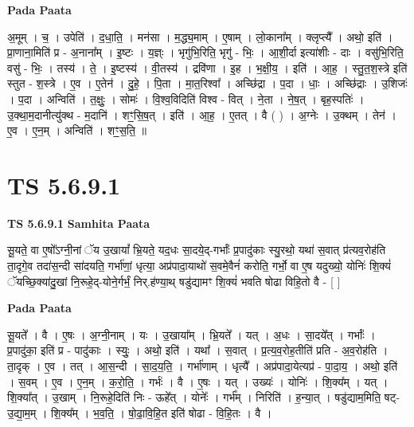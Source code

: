 \documentclass[17pt]{extarticle}
\begin{document}
\textbf{Pada Paata} \newline

अ॒मूम् । च॒ । उपेति॑ । द॒धा॒ति॒ । मन॑सा । म॒द्ध्य॒माम् । ए॒षाम् । लो॒काना᳚म् । क्लृप्त्यै᳚ । अथो॒ इति॑ । प्रा॒णाना॒मिति॑ प्र - अ॒नाना᳚म् । इ॒ष्टः । य॒ज्ञ्ः । भृगु॑भि॒रिति॒ भृगु॑ - भिः॒ । आ॒शी॒र्दा इत्या॑शीः - दाः । वसु॑भि॒रिति॒ वसु॑ - भिः॒ । तस्य॑ । ते॒ । इ॒ष्टस्य॑ । वी॒तस्य॑ । द्रवि॑णा । इ॒ह । भ॒क्षी॒य॒ । इति॑ । आ॒ह॒ । स्तु॒त॒श॒स्त्रे इति॑ स्तुत - श॒स्त्रे । ए॒व । ए॒तेन॑ । दु॒हे॒ । पि॒ता । मा॒त॒रिश्वा᳚ । अच्छि॑द्रा । प॒दा । धाः॒ । अच्छि॑द्राः । उ॒शिजः॑ । प॒दा । अन्विति॑ । त॒क्षुः॒ । सोमः॑ । वि॒श्व॒विदिति॑ विश्व - वित् । ने॒ता । ने॒ष॒त् । बृह॒स्पतिः॑ । उ॒क्था॒म॒दानीत्यु॑क्थ - म॒दानि॑ । शꣳ॒॒सि॒ष॒त् । इति॑ । आ॒ह॒ । ए॒तत् । वै ( ) । अ॒ग्नेः । उ॒क्थम् । तेन॑ । ए॒व । ए॒न॒म् । अन्विति॑ । शꣳ॒॒स॒ति॒ ॥  \newline




\section*{ TS 5.6.9.1 }

\textbf{TS 5.6.9.1 } \newline
\textbf{Samhita Paata} \newline

सू॒यते॒ वा ए॒षो᳚ऽग्नी॒नां ॅय उ॒खायां᳚ भ्रि॒यते॒ यद॒धः सा॒दये॒द्-गर्भाः᳚ प्र॒पादु॑काः स्यु॒रथो॒ यथा॑ स॒वात् प्र॑त्यव॒रोह॑ति ता॒दृगे॒व तदा॑स॒न्दी सा॑दयति॒ गर्भा॑णां॒ धृत्या॒ अप्र॑पादा॒याथो॑ स॒वमे॒वैनं॑ करोति॒ गर्भो॒ वा ए॒ष यदुख्यो॒ योनिः॑ शि॒क्यं॑ ॅयच्छि॒क्या॑दु॒खां नि॒रूहे॒द्-योने॒र्गर्भं॒ निर्.ह॑ण्या॒थ् षडु॑द्यामꣳ शि॒क्यं॑ भवति षोढा विहि॒तो वै - [  ] \newline

\textbf{Pada Paata} \newline

सू॒यते᳚ । वै । ए॒षः । अ॒ग्नी॒नाम् । यः । उ॒खाया᳚म् । भ्रि॒यते᳚ । यत् । अ॒धः । सा॒दये᳚त् । गर्भाः᳚ । प्र॒पादु॑का॒ इति॑ प्र - पादु॑काः । स्युः॒ । अथो॒ इति॑ । यथा᳚ । स॒वात् । प्र॒त्य॒व॒रोह॒तीति॑ प्रति - अ॒व॒रोह॑ति । ता॒दृक् । ए॒व । तत् । आ॒स॒न्दी । सा॒द॒य॒ति॒ । गर्भा॑णाम् । धृत्यै᳚ । अप्र॑पादा॒येत्यप्र॑ - पा॒दा॒य॒ । अथो॒ इति॑ । स॒वम् । ए॒व । ए॒न॒म् । क॒रो॒ति॒ । गर्भः॑ । वै । ए॒षः । यत् । उख्यः॑ । योनिः॑ । शि॒क्य᳚म् । यत् । शि॒क्या᳚त् । उ॒खाम् । नि॒रूहे॒दिति॑ निः - ऊहे᳚त् । योनेः᳚ । गर्भ᳚म् । निरिति॑ । ह॒न्या॒त् । षडु॑द्याम॒मिति॒ षट्-उ॒द्या॒म॒म् । शि॒क्य᳚म् । भ॒व॒ति॒ । षो॒ढा॒वि॒हि॒त इति॑ षोढा - वि॒हि॒तः । वै ।  \newline
\end{document}
